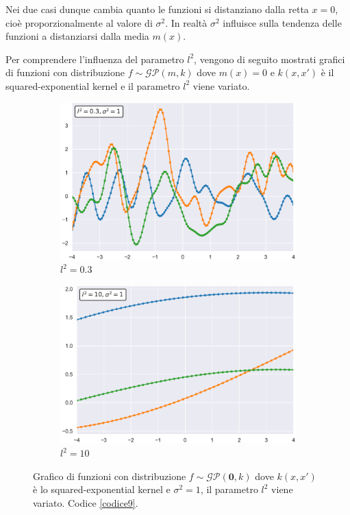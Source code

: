 Nei due casi dunque cambia quanto le funzioni si distanziano dalla retta $x=0$, cioè proporzionalmente al valore di $\sigma^2$. In realtà $\sigma^2$ influisce sulla tendenza delle funzioni a distanziarsi dalla media $m(x)$.

Per comprendere l'influenza del parametro $l^2$, vengono di seguito mostrati grafici di funzioni con distribuzione $f\sim \mathcal{GP}(m,k)$ dove $m(x)=0$ e $k(x,x')$ è il squared-exponential kernel e il parametro $l^2$ viene variato.


\begin{figure}[h]
\centering
\begin{subfigure}{.5\textwidth}
  \centering
  \includegraphics[width=\linewidth]{images/Gaussian process/RBF - l=03.pdf}
  \caption{$l^2=0.3$}
\end{subfigure}%
\begin{subfigure}{.5\textwidth}
  \centering
  \includegraphics[width=\linewidth]{images/Gaussian process/RBF - l=10.pdf}
  \caption{$l^2=10$}
\end{subfigure}
\caption{Grafico di funzioni con distribuzione  $f\sim \mathcal{GP}(\bm{0},k)$ dove $k(x,x')$ è lo squared-exponential kernel e $\sigma^2=1$, il parametro $l^2$ viene variato. Codice \ref{codice9}.}
\label{10 sample exponential modified l}
\end{figure}

